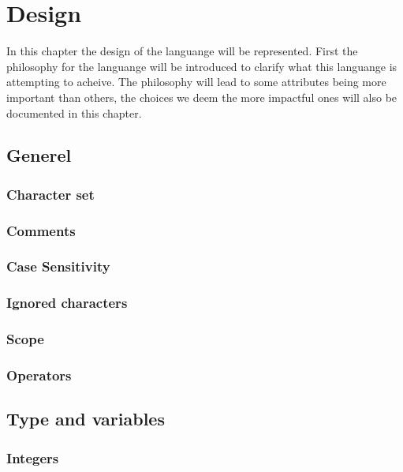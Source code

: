 \chapter{Design}
\label{cha:Design}
In this chapter the design of the languange will be represented.
First the philosophy for the languange will be introduced to clarify what this languange is attempting to acheive.
The philosophy will lead to some attributes being more important than others, the choices we deem the more impactful ones will also be documented in this chapter.



\section{Generel}
\subsection{Character set}

\subsection{Comments}

\subsection{Case Sensitivity}

\subsection{Ignored characters}

\subsection{Scope}

\subsection{Operators}

\section{Type and variables}\label{Types}
\subsection{Integers}

